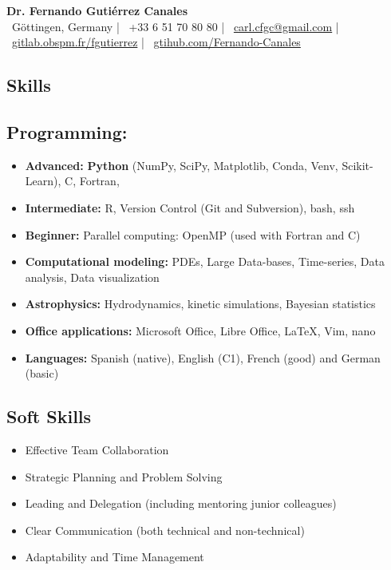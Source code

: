 \documentclass[11pt,a4paper]{article}
\begin{document}
\begin{center}
  {\Huge\bfseries Dr. Fernando Guti\'errez Canales}\\[8pt]
  \faMapMarker*~Göttingen, Germany \quad | \quad
  \faPhone~+33 6 51 70 80 80 \quad | \quad
  \faEnvelope~\href{mailto:carl.cfgc@gmail.com}{carl.cfgc@gmail.com} \quad | \quad
  \faGitlab~\href{https://gitlab.obspm.fr/fgutierrez}{gitlab.obspm.fr/fgutierrez} \quad | \quad
  \faGithub~\href{https://github.com/Fernando-Canales}{gtihub.com/Fernando-Canales}
\end{center}
	
	\vspace{10pt}
	
	\begin{multicols}{2}
		
		\section{Skills}
		
		\subsection{Programming:}
		\begin{itemize}
			\item \textbf{Advanced:} \textbf{Python} (NumPy, SciPy, Matplotlib, Conda, Venv, Scikit-Learn), C, Fortran,
			\item \textbf{Intermediate:} R, Version Control (Git and Subversion), bash, ssh
			\item \textbf{Beginner:} Parallel computing: OpenMP (used with Fortran and C)
			\item \textbf{Computational modeling:} PDEs, Large Data-bases, Time-series, Data analysis, Data visualization
			\item \textbf{Astrophysics:} Hydrodynamics, kinetic simulations, Bayesian statistics
			\item \textbf{Office applications:} Microsoft Office, Libre Office, \LaTeX , Vim, nano
			\item \textbf{Languages:} Spanish (native), English (C1), French (good) and German (basic)
		\end{itemize}
		
		\subsection{Soft Skills}
		
		\begin{itemize}
			\item Effective Team Collaboration
			\item Strategic Planning and Problem Solving
			\item Leading and Delegation (including mentoring junior colleagues)
			\item Clear Communication (both technical and non-technical)
			\item Adaptability and Time Management
		\end{itemize}
		

\end{multicols}
\end{document}
